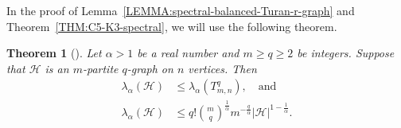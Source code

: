 \documentclass[11pt,a4paper]{article}
\newtheorem{theorem}[definition]{Theorem}
\begin{document}
In the proof of Lemma~\ref{LEMMA:spectral-balanced-Turan-r-graph} and Theorem~\ref{THM:C5-K3-spectral}, we will use the following theorem. 
%
\begin{theorem}[{\cite[Theorems~2~and~3]{KNY15}}]\label{THM:KNY_spectral-upper-bound-k-partite-graph}  
    Let $\alpha > 1$ be a real number and $m \ge q \ge 2$ be integers. Suppose that $\mathcal{H}$ is an $m$-partite $q$-graph on $n$ vertices. 
    Then 
    \begin{align}
        \lambda_{\alpha}(\mathcal{H})
        & \le \lambda_{\alpha}(T_{m,n}^{q}), \quad\text{and} \label{equ:KNY15-a} \\[0.3em]
        \lambda_{\alpha}(\mathcal{H})
        & \le q!\binom{m}{q}^{\frac{1}{\alpha}}m^{-\frac{q}{\alpha}}|\mathcal{H}|^{1-\frac{1}{\alpha}}. \label{equ:KNY15-b}
    \end{align}
\end{theorem}
\end{document}
